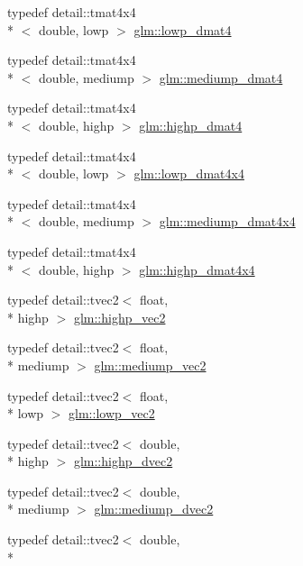 \begin{DoxyCompactItemize}
typedef detail\-::tmat4x4\\*
$<$ double, lowp $>$ \hyperlink{group__core__precision_gaea69794db4e619881b77d37bf84b337e}{glm\-::lowp\-\_\-dmat4}
\item 
typedef detail\-::tmat4x4\\*
$<$ double, mediump $>$ \hyperlink{group__core__precision_ga73de517f040f7d50746bbe273a396685}{glm\-::mediump\-\_\-dmat4}
\item 
typedef detail\-::tmat4x4\\*
$<$ double, highp $>$ \hyperlink{group__core__precision_ga9a5d95e476d451d28d3939ac7f124baf}{glm\-::highp\-\_\-dmat4}
\item 
typedef detail\-::tmat4x4\\*
$<$ double, lowp $>$ \hyperlink{group__core__precision_gac762dec40f53114dfe6894499a2c9a79}{glm\-::lowp\-\_\-dmat4x4}
\item 
typedef detail\-::tmat4x4\\*
$<$ double, mediump $>$ \hyperlink{group__core__precision_gad64329d45b05417ccf0cc3c23f584d26}{glm\-::mediump\-\_\-dmat4x4}
\item 
typedef detail\-::tmat4x4\\*
$<$ double, highp $>$ \hyperlink{group__core__precision_ga1c0a2edbde597b59e9005691a224b208}{glm\-::highp\-\_\-dmat4x4}
\item 
typedef detail\-::tvec2$<$ float, \\*
highp $>$ \hyperlink{group__core__precision_ga37645abcfcc1278567e99f1ca492bfbb}{glm\-::highp\-\_\-vec2}
\item 
typedef detail\-::tvec2$<$ float, \\*
mediump $>$ \hyperlink{group__core__precision_ga1365858c541931eb8a7473fa85a1d1cf}{glm\-::mediump\-\_\-vec2}
\item 
typedef detail\-::tvec2$<$ float, \\*
lowp $>$ \hyperlink{group__core__precision_gac63d79532b7e8d18f579ebe63e4fde49}{glm\-::lowp\-\_\-vec2}
\item 
typedef detail\-::tvec2$<$ double, \\*
highp $>$ \hyperlink{group__core__precision_gacfbe8512142fff27f0bfb44958c1752f}{glm\-::highp\-\_\-dvec2}
\item 
typedef detail\-::tvec2$<$ double, \\*
mediump $>$ \hyperlink{group__core__precision_gace1f1cc2eb8e978dcb60e682af87b541}{glm\-::mediump\-\_\-dvec2}
\item 
typedef detail\-::tvec2$<$ double, \\*

\end{DoxyCompactItemize}
